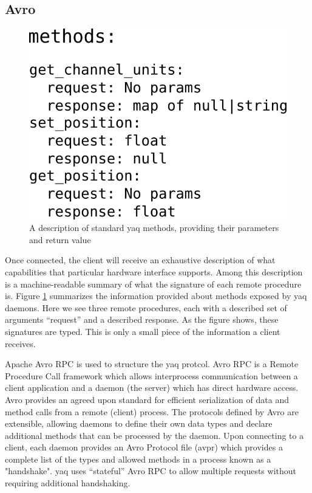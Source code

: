 \documentclass[aip, amsmath, amssymb, reprint,]{revtex4-1}
\begin{document}
\subsection{Avro}

\begin{figure}
  \includegraphics[width=\columnwidth]{./figures/methods.png}
  \caption{  \label{fig:methods} A description of standard yaq methods, providing their parameters and return value}
\end{figure}

Once connected, the client will receive an exhaustive description of what capabilities that particular hardware interface supports.
Among this description is a machine-readable summary of what the signature of each remote procedure is.
Figure \ref{fig:methods} summarizes the information provided about methods exposed by yaq daemons.
Here we see three remote procedures, each with a described set of arguments ``request'' and a described response.
As the figure shows, these signatures are typed.
This is only a small piece of the information a client receives.

Apache Avro RPC \cite{AvroSpecification} is used to structure the yaq protcol.
Avro RPC is a Remote Procedure Call framework which allows interprocess communication between a client application and a daemon (the server) which has direct hardware access.
Avro provides an agreed upon standard for efficient serialization of data and method calls from a remote (client) process.
The protocols defined by Avro are extensible, allowing daemons to define their own data types and declare additional methods that can be processed by the daemon.
Upon connecting to a client, each daemon provides an Avro Protocol file (avpr) which provides a complete list of the types and allowed methods in a process known as a "handshake".
yaq uses ``stateful'' Avro RPC to allow multiple requests without requiring additional handshaking.
\end{document}
